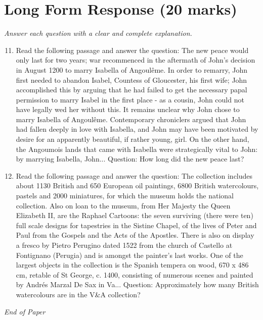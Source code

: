 \documentclass[12pt]{article}
\begin{document}
\section*{Long Form Response (20 marks)}
\textit{Answer each question with a clear and complete explanation.}
\begin{enumerate}[label=\arabic*.]
\setcounter{enumi}{10}
\item Read the following passage and answer the question: The new peace would only last for two years; war recommenced in the aftermath of John's decision in August 1200 to marry Isabella of Angoulême. In order to remarry, John first needed to abandon Isabel, Countess of Gloucester, his first wife; John accomplished this by arguing that he had failed to get the necessary papal permission to marry Isabel in the first place - as a cousin, John could not have legally wed her without this. It remains unclear why John chose to marry Isabella of Angoulême. Contemporary chroniclers argued that John had fallen deeply in love with Isabella, and John may have been motivated by desire for an apparently beautiful, if rather young, girl. On the other hand, the Angoumois lands that came with Isabella were strategically vital to John: by marrying Isabella, John... Question: How long did the new peace last?
\item Read the following passage and answer the question: The collection includes about 1130 British and 650 European oil paintings, 6800 British watercolours, pastels and 2000 miniatures, for which the museum holds the national collection. Also on loan to the museum, from Her Majesty the Queen Elizabeth II, are the Raphael Cartoons: the seven surviving (there were ten) full scale designs for tapestries in the Sistine Chapel, of the lives of Peter and Paul from the Gospels and the Acts of the Apostles. There is also on display a fresco by Pietro Perugino dated 1522 from the church of Castello at Fontignano (Perugia) and is amongst the painter's last works. One of the largest objects in the collection is the Spanish tempera on wood, 670 x 486 cm, retable of St George, c. 1400, consisting of numerous scenes and painted by Andrés Marzal De Sax in Va... Question: Approximately how many British watercolours are in the V\&A collection?
\end{enumerate}

\vfill
\noindent\textit{End of Paper}
\end{document}
